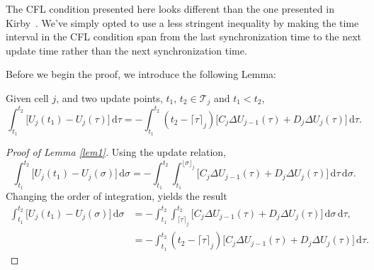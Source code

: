 \begin{remark}
The CFL condition presented here looks different than the one presented in Kirby~\cite{Kirby2003}. We've simply opted to use a less stringent inequality by making the time interval in the CFL condition span from the last synchronization time to the next update time rather than the next synchronization time.
\end{remark}
Before we begin the proof, we introduce the following Lemma:
\begin{lemma}
\label{lem1}
Given cell $j$, and two update points, $t_1,\,t_2 \in \mathcal{T}_j$ and $t_1 < t_2$,
\begin{equation*}
\int_{t_1}^{t_2} \big[ U_j(t_1) - U_j(\tau) \big] \,\mathrm{d}\tau = - \int_{t_1}^{t_2} (t_2 - \lceil \tau \rceil_j) \big[ C_j \Delta U_{j-1}(\tau) + D_j \Delta U_j(\tau)\big] \,\mathrm{d} \tau.
\end{equation*}
\end{lemma}
\begin{proof}[Proof of Lemma \ref{lem1}]
Using the update relation,
\begin{equation*}
\int_{t_1}^{t_2} \big[ U_j(t_1) - U_j(\sigma) \big] \,\mathrm{d}\sigma = - \int_{t_1}^{t_2} \int_{t_1}^{\lfloor \sigma \rfloor_j} \big[ C_j \Delta U_{j-1}(\tau) + D_j \Delta U_j(\tau) \big] \,\mathrm{d} \tau \,\mathrm{d} \sigma.
\end{equation*}
Changing the order of integration, yields the result
\begin{align*}
\int_{t_1}^{t_2} \big[ U_j(t_1) - U_j(\sigma) \big] \,\mathrm{d}\sigma &= - \int_{t_1}^{t_2} \int_{\lceil \tau \rceil_j}^{t_2} \big[ C_j \Delta U_{j-1}(\tau) + D_j \Delta U_j(\tau) \big] \,\mathrm{d} \sigma \, \mathrm{d} \tau,\\
&= - \int_{t_1}^{t_2} (t_2 - \lceil \tau \rceil_j) \big[ C_j \Delta U_{j-1}(\tau) + D_j \Delta U_j ( \tau ) \big] \, \mathrm{d} \tau.
\end{align*}
\end{proof}


